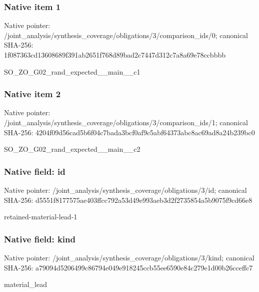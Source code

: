 \documentclass[10pt,a4paper]{article}
\begin{document}
\subsubsection{Native item 1}
Native pointer: /joint\_\allowbreak{}analysis/synthesis\_\allowbreak{}coverage/obligations/3/comparison\_\allowbreak{}ids/0; canonical SHA-256: 1f087363cd13608689f391ab2651f768d89bad2c7447d312c7a8a69e78ccbbbb

\begingroup\raggedright\sloppy SO\_\allowbreak{}ZO\_\allowbreak{}G02\_\allowbreak{}rand\_\allowbreak{}expected\_\allowbreak{}\_\allowbreak{}main\_\allowbreak{}\_\allowbreak{}c1\par\endgroup

\subsubsection{Native item 2}
Native pointer: /joint\_\allowbreak{}analysis/synthesis\_\allowbreak{}coverage/obligations/3/comparison\_\allowbreak{}ids/1; canonical SHA-256: 4204f09d56cad5b6f04c7bada3bcf0af9c5abf64373abc8ac69ad8a24b239bc0

\begingroup\raggedright\sloppy SO\_\allowbreak{}ZO\_\allowbreak{}G02\_\allowbreak{}rand\_\allowbreak{}expected\_\allowbreak{}\_\allowbreak{}main\_\allowbreak{}\_\allowbreak{}c2\par\endgroup

\subsubsection{Native field: id}
Native pointer: /joint\_\allowbreak{}analysis/synthesis\_\allowbreak{}coverage/obligations/3/id; canonical SHA-256: d5551f8177575ae403ffcc792a53d49e993aeb3d2f2735854a5b9075f9cd66e8

\begingroup\raggedright\sloppy retained-material-lead-1\par\endgroup

\subsubsection{Native field: kind}
Native pointer: /joint\_\allowbreak{}analysis/synthesis\_\allowbreak{}coverage/obligations/3/kind; canonical SHA-256: a79094d5206499c86794e049e918245ccb55ee6590e84c279e1d00b26cceffc7

\begingroup\raggedright\sloppy material\_\allowbreak{}lead\par\endgroup
\end{document}
